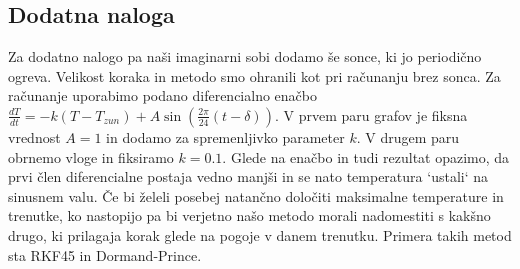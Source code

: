 \documentclass{article}
\begin{document}
\subsection{Dodatna naloga}
Za dodatno nalogo pa naši imaginarni sobi dodamo še sonce, ki jo periodično ogreva. Velikost koraka in metodo smo ohranili kot pri računanju brez sonca. Za računanje uporabimo podano diferencialno enačbo $\frac{dT}{dt}=-k(T-T_{zun}) + A \sin{\left(\frac{2\pi}{24}(t - \delta)\right)}$. V prvem paru grafov je fiksna vrednost $A=1$ in dodamo za spremenljivko parameter $k$. V drugem paru obrnemo vloge in fiksiramo $k=0.1$. Glede na enačbo in tudi rezultat opazimo, da prvi člen diferencialne postaja vedno manjši in se nato temperatura `ustali` na sinusnem valu. Če bi želeli posebej natančno določiti maksimalne temperature in trenutke, ko nastopijo pa bi verjetno  našo metodo morali nadomestiti s kakšno drugo, ki prilagaja korak glede na pogoje v danem trenutku. Primera takih metod sta RKF45 in Dormand-Prince.
\end{document}
